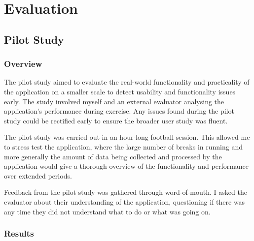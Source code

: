 \documentclass{l4proj}
\begin{document}
\chapter{Evaluation} 
\label{sec:eval}

\section{Pilot Study}
\label{sec:pilotstudy}

\subsection{Overview}
\label{sec:pilotoverview}

The pilot study aimed to evaluate the real-world functionality and practicality of the application on a smaller scale to detect usability and functionality issues early. The study involved myself and an external evaluator analysing the application’s performance during exercise. Any issues found during the pilot study could be rectified early to ensure the broader user study was fluent. 

The pilot study was carried out in an hour-long football session. This allowed me to stress test the application, where the large number of breaks in running and more generally the amount of data being collected and processed by the application would give a thorough overview of the functionality and performance over extended periods.

Feedback from the pilot study was gathered through word-of-mouth. I asked the evaluator about their understanding of the application, questioning if there was any time they did not understand what to do or what was going on. 

\subsection{Results}
\label{sec:pilotresults}
\end{document}
